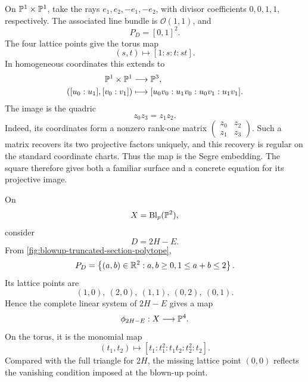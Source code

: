 \begin{example}
\label{ex:classroom-segre-square}
On \(\PP^1\times\PP^1\), take the rays
\(e_1,e_2,-e_1,-e_2\), with divisor coefficients \(0,0,1,1\),
respectively. The associated line bundle is \(\mathcal O(1,1)\), and
\[
P_D=[0,1]^2.
\]
The four lattice points give the torus map
\[
(s,t)\longmapsto[1:s:t:st].
\]
In homogeneous coordinates this extends to
\[
\begin{aligned}
\PP^1\times\PP^1&\longrightarrow\PP^3,\\
([u_0:u_1],[v_0:v_1])
&\longmapsto[u_0v_0:u_1v_0:u_0v_1:u_1v_1].
\end{aligned}
\]
The image is the quadric
\[
z_0z_3=z_1z_2.
\]
Indeed, its coordinates form a nonzero rank-one matrix
\(\left(\begin{smallmatrix}z_0&z_2\\z_1&z_3\end{smallmatrix}\right)\).
Such a matrix recovers its two projective factors uniquely, and this
recovery is regular on the standard coordinate charts. Thus the map
is the Segre embedding. The square therefore gives both a familiar
surface and a concrete equation for its projective image.
\end{example}

\begin{example}
On
\[
X=\Blp{\PP^2}{p},
\]
consider
\[
D=2H-E.
\]
From \cref{fig:blowup-truncated-section-polytope},
\[
P_D=
\left\{
(a,b)\in\RR^2:
 a,b\geq 0,
 1\leq a+b\leq 2
\right\}.
\]
Its lattice points are
\[
(1,0),\ (2,0),\ (1,1),\ (0,2),\ (0,1).
\]
Hence the complete linear system of \(2H-E\) gives a map
\[
\phi_{2H-E}:X\longrightarrow \PP^4.
\]
On the torus, it is the monomial map
\[
(t_1,t_2)
\longmapsto
[t_1:t_1^2:t_1t_2:t_2^2:t_2].
\]
Compared with the full triangle for \(2H\), the missing lattice point
\((0,0)\) reflects the vanishing condition imposed at the blown-up
point.
\end{example}

